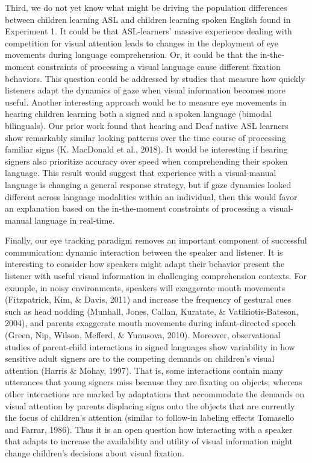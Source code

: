 \documentclass[,man,floatsintext]{apa6}
\begin{document}
Third, we do not yet know what might be driving the population
differences between children learning ASL and children learning spoken
English found in Experiment 1. It could be that ASL-learners' massive
experience dealing with competition for visual attention leads to
changes in the deployment of eye movements during language
comprehension. Or, it could be that the in-the-moment constraints of
processing a visual language cause different fixation behaviors. This
question could be addressed by studies that measure how quickly
listeners adapt the dynamics of gaze when visual information becomes
more useful. Another interesting approach would be to measure eye
movements in hearing children learning both a signed and a spoken
language (bimodal bilinguals). Our prior work found that hearing and
Deaf native ASL learners show remarkably similar looking patterns over
the time course of processing familiar signs (K. MacDonald et al.,
2018). It would be interesting if hearing signers also prioritize
accuracy over speed when comprehending their spoken language. This
result would suggest that experience with a visual-manual language is
changing a general response strategy, but if gaze dynamics looked
different across language modalities within an individual, then this
would favor an explanation based on the in-the-moment constraints of
processing a visual-manual language in real-time.

Finally, our eye tracking paradigm removes an important component of
successful communication: dynamic interaction between the speaker and
listener. It is interesting to consider how speakers might adapt their
behavior present the listener with useful visual information in
challenging comprehension contexts. For example, in noisy environments,
speakers will exaggerate mouth movements (Fitzpatrick, Kim, \& Davis,
2011) and increase the frequency of gestural cues such as head nodding
(Munhall, Jones, Callan, Kuratate, \& Vatikiotis-Bateson, 2004), and
parents exaggerate mouth movements during infant-directed speech (Green,
Nip, Wilson, Mefferd, \& Yunusova, 2010). Moreover, observational
studies of parent-child interactions in signed languages show
variability in how sensitive adult signers are to the competing demands
on children's visual attention (Harris \& Mohay, 1997). That is, some
interactions contain many utterances that young signers miss because
they are fixating on objects; whereas other interactions are marked by
adaptations that accommodate the demands on visual attention by parents
displacing signs onto the objects that are currently the focus of
children's attention (similar to follow-in labeling effects Tomasello
and Farrar, 1986). Thus it is an open question how interacting with a
speaker that adapts to increase the availability and utility of visual
information might change children's decisions about visual fixation.
\end{document}
